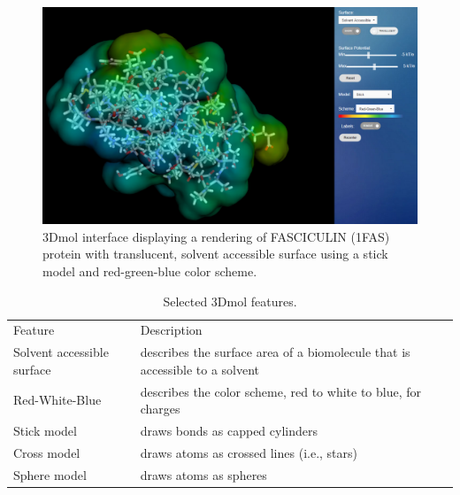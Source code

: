 \documentclass[11pt,titlepage]{article}
\begin{document}
\begin{figure} 
	\begin{center}
		\includegraphics[width=.80\textwidth]{3dmol_interface.png}
		\caption{\small 3Dmol interface displaying a
			rendering of FASCICULIN (1FAS) protein with
			translucent, solvent accessible surface using a
			stick model and red-green-blue color scheme. 
			\color{black}  \label{fig:3dmol_interface}}  
	\end{center}  
\end{figure}

\begin{table}
	\small
	\begin{center}
		\caption{Selected 3Dmol features.}
		\label{tab:table1}
		\begin{tabular}{l l}
			Feature & Description\\
			Solvent accessible surface & describes the surface area of a biomolecule that is accessible to a solvent \\
			Red-White-Blue & describes the color scheme, red to white to blue, for charges \\
			Stick model & draws bonds as capped cylinders \\
			Cross model & draws atoms as crossed lines (i.e., stars) \\
			Sphere model & draws atoms as spheres \\
		\end{tabular}
	\end{center}
\end{table}
\end{document}
